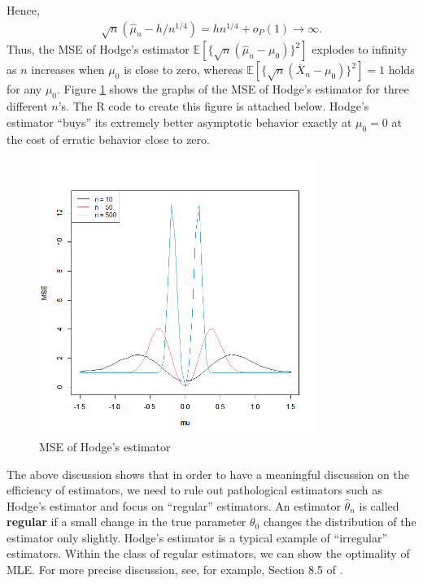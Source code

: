 \documentclass[10.5pt, A4paper, openany, uplatex]{book}
\newcommand{\E}{\mathbb{E}}
\renewcommand{\hat}{\widehat}
\renewcommand{\bar}{\overline}
\numberwithin{equation}{section}
\begin{document}
Hence,
\begin{align*}
	\sqrt{n}(\hat \mu_n - h/n^{1/4}) = hn^{1/4} + o_P(1) \to \infty.
\end{align*}
Thus, the MSE of Hodge's estimator $\E [\{\sqrt{n}(\hat \mu_n - \mu_0)\}^2]$ explodes to infinity as $n$ increases when $\mu_0$ is close to zero, whereas $\E[\{\sqrt{n}(\bar X_n - \mu_0)\}^2] = 1$ holds for any $\mu_0$.
Figure \ref{fig:hodge} shows the graphs of the MSE of Hodge's estimator for three different $n$'s.
The R code to create this figure is attached below.
Hodge's estimator ``buys'' its extremely better asymptotic behavior exactly at $\mu_0 = 0$ at the cost of erratic behavior close to zero.

\begin{figure}[h!]
	\begin{center}
		\includegraphics[width = 9cm]{hodge.png}
		\caption{MSE of Hodge's estimator}
		\label{fig:hodge}
	\end{center}
\end{figure}

The above discussion shows that in order to have a meaningful discussion on the efficiency of estimators, we need to rule out pathological estimators such as Hodge's estimator and focus on ``regular'' estimators.
An estimator $\hat \theta_n$ is called \textbf{regular} if a small change in the true parameter $\theta_0$ changes the distribution of the estimator only slightly.
Hodge's estimator is a typical example of ``irregular'' estimators.
Within the class of regular estimators, we can show the optimality of MLE.
For more precise discussion, see, for example, Section 8.5 of \cite{van2000asymptotic}.
\end{document}

